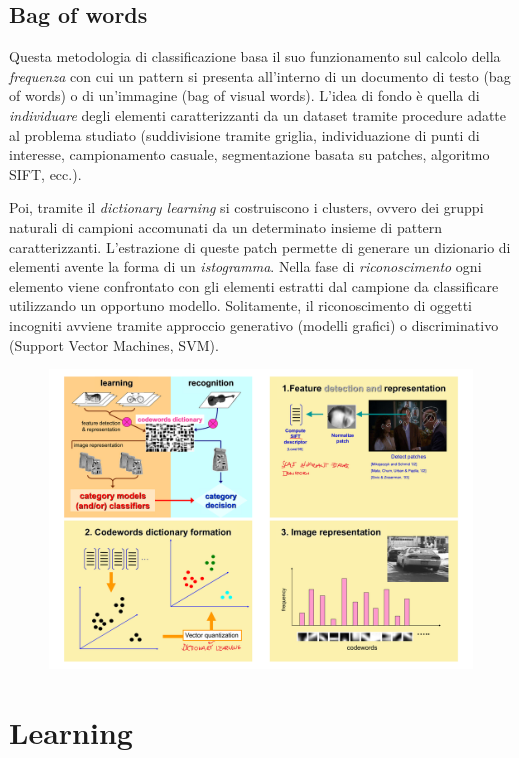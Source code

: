 \documentclass[a4paper,oneside,titlepage]{book}
\begin{document}
\section{Bag of words}
Questa metodologia di classificazione basa il suo funzionamento sul calcolo della \textit{frequenza} con cui un pattern si presenta all'interno di un documento di testo (bag of words) o di un'immagine (bag of visual words). L'idea di fondo è quella di \textit{individuare} degli elementi caratterizzanti da un dataset tramite procedure adatte al problema studiato (suddivisione tramite griglia, individuazione di punti di interesse, campionamento casuale, segmentazione basata su patches, algoritmo SIFT, ecc.).

Poi, tramite il \textit{dictionary learning} si costruiscono i clusters, ovvero dei gruppi naturali di campioni accomunati da un determinato insieme di pattern caratterizzanti. L'estrazione di queste patch permette di generare un dizionario di elementi avente la forma di un \textit{istogramma}. Nella fase di \textit{riconoscimento} ogni elemento viene confrontato con gli elementi estratti dal campione da classificare utilizzando un opportuno modello. Solitamente, il riconoscimento di oggetti incogniti avviene tramite approccio generativo (modelli grafici) o discriminativo
(Support Vector Machines, SVM).
\begin{figure}[htp]
	\centering
	\includegraphics[width=\textwidth, height=\textheight, keepaspectratio]{bow.png}
\end{figure}


\chapter{Learning}
\end{document}
